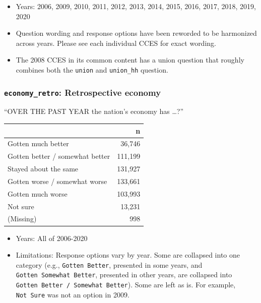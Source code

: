 \documentclass[10pt,article,oneside]{memoir}
\theoremstyle{definition}
\begin{document}
\begin{itemize}
\tightlist
\item
  Years: 2006, 2009, 2010, 2011, 2012, 2013, 2014, 2015, 2016, 2017,
  2018, 2019, 2020
\item
  Question wording and response options have been reworded to be
  harmonized across years. Please see each individual CCES for exact
  wording.
\item
  The 2008 CCES in its common content has a union question that roughly
  combines both the \texttt{union} and \texttt{union\_hh} question.
\end{itemize}

\hypertarget{economy_retro-retrospective-economy}{%
\subsubsection{\texorpdfstring{\texttt{economy\_retro}: Retrospective
economy}{economy\_retro: Retrospective economy}}\label{economy_retro-retrospective-economy}}

``OVER THE PAST YEAR the nation's economy has \ldots?''

\begin{table}[H]
\centering
\begin{tabular}{lr}
\toprule
 & n\\
\midrule
Gotten much better & 36,746\\
Gotten better / somewhat better & 111,199\\
Stayed about the same & 131,927\\
Gotten worse / somewhat worse & 133,661\\
Gotten much worse & 103,993\\
Not sure & 13,231\\
(Missing) & 998\\
\bottomrule
\end{tabular}
\end{table}

\begin{itemize}
\tightlist
\item
  Years: All of 2006-2020
\item
  Limitations: Response options vary by year. Some are collapsed into
  one category (e.g., \texttt{Gotten\ Better}, presented in some years,
  and \texttt{Gotten\ Somewhat\ Better}, presented in other years, are
  collapsed into \texttt{Gotten\ Better\ /\ Somewhat\ Better}). Some are
  left as is. For example, \texttt{Not\ Sure} was not an option in 2009.
\end{itemize}
\end{document}

